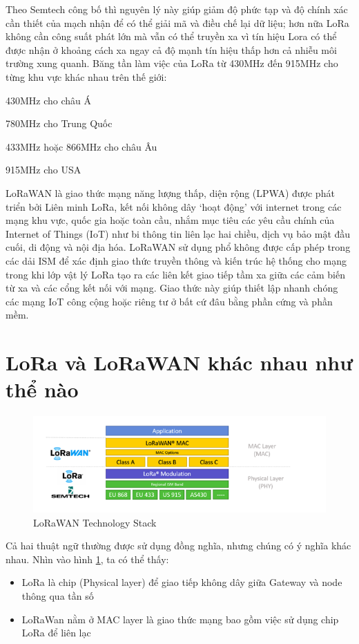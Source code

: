 Theo Semtech công bố thì nguyên lý này giúp giảm độ phức tạp và độ chính xác cần thiết của mạch nhận để có thể giải mã và điều chế lại dữ liệu; hơn nữa LoRa không cần công suất phát lớn mà vẫn có thể truyền xa vì tín hiệu Lora có thể được nhận ở khoảng cách xa ngay cả độ mạnh tín hiệu thấp hơn cả nhiễu môi trường xung quanh.
Băng tần làm việc của LoRa từ 430MHz đến 915MHz cho từng khu vực khác nhau trên thế giới:

430MHz cho châu Á

780MHz cho Trung Quốc

433MHz hoặc 866MHz cho châu Âu

915MHz cho USA

LoRaWAN là giao thức mạng năng lượng thấp, diện rộng (LPWA) được phát triển bởi Liên minh LoRa, kết nối không dây ‘hoạt động’ với internet trong các mạng khu vực, quốc gia hoặc toàn cầu, nhắm mục tiêu các yêu cầu chính của Internet of Things (IoT) như bi thông tin liên lạc hai chiều, dịch vụ bảo mật đầu cuối, di động và nội địa hóa.
LoRaWAN sử dụng phổ không được cấp phép trong các dải ISM để xác định giao thức truyền thông và kiến ​​trúc hệ thống cho mạng trong khi lớp vật lý LoRa tạo ra các liên kết giao tiếp tầm xa giữa các cảm biến từ xa và các cổng kết nối với mạng. Giao thức này giúp thiết lập nhanh chóng các mạng IoT công cộng hoặc riêng tư ở bất cứ đâu bằng phần cứng và phần mềm.

\section{LoRa và LoRaWAN khác nhau như thể nào}

\begin{figure}[H]
    \includegraphics[width=\textwidth]{images/Quanh/LoraWan_Stack.png}
    \caption{LoRaWAN Technology Stack}
    \label{fig:lorawan_stack}
\end{figure}

Cả hai thuật ngữ thường được sử dụng đồng nghĩa, nhưng chúng có ý nghĩa khác nhau. Nhìn vào hình \ref{fig:lorawan_stack}, ta có thể thấy:
\begin{itemize}
    \item LoRa là chip (Physical layer) để giao tiếp không dây giữa Gateway và node thông qua tần số
    \item LoRaWan nằm ở MAC layer là giao thức mạng bao gồm việc sử dụng chip LoRa để liên lạc
\end{itemize}

